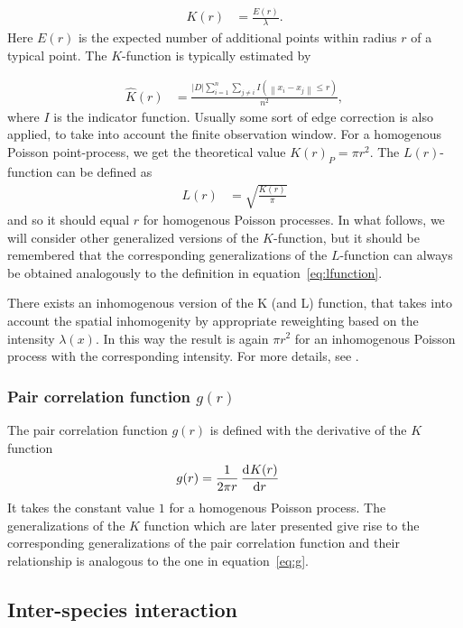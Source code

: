 \documentclass[12pt,a4paper,oneside,article]{memoir}
\begin{document}
\begin{align}
	K(r)&=\frac{E(r)}{\lambda}.
	\label{eq:K}
\end{align}
Here $E(r)$ is the expected number of additional points within radius $r$ 
of a typical point. The $K$-function is typically estimated by

\begin{align}
	\hat{K}(r)&=\frac{\left|D\right|\sum_{i=1}^n\sum_{j\neq i}I\left(\left\| x_i-x_j\right\|\leq r\right)}{n^2},
	\label{eq:Kest}
\end{align} 
where $I$ is the indicator function. Usually some sort of edge correction is also applied, to take into
account the finite observation window. For a homogenous Poisson point-process, we get
the theoretical value $K(r)_{P}=\pi r^2$.
The $L(r)$-function can be defined as
\begin{align}
	L(r)&=\sqrt{\frac{K(r)}{\pi}}
	\label{eq:lfunction}
\end{align}
and so it should equal $r$ for homogenous Poisson processes. In what follows, we will
consider other generalized versions of the $K$-function, but it should be remembered
that the corresponding generalizations of the $L$-function can always be obtained
analogously to the definition in equation~\eqref{eq:lfunction}.

There exists an inhomogenous version of the K (and L) function, that takes into account
the spatial inhomogenity by appropriate reweighting based on the intensity $\lambda(x)$. In this way the result is
again $\pi r^2$ for an inhomogenous Poisson process with the corresponding intensity. For more details,
see \cite{inhomogenousK}.

\subsubsection{Pair correlation function $g(r)$}

The pair correlation function $g(r)$ is defined with the derivative of the $K$ function
\begin{align}
	g(r)&=\frac{1}{2\pi r}\dod{K(r)}{r}
	\label{eq:g}
\end{align}
It takes the constant value $1$ for a homogenous Poisson process. The
generalizations of the $K$ function which are later presented give rise
to the corresponding generalizations of the pair correlation function and
their relationship is analogous to the one in equation~\eqref{eq:g}.


\subsection{Inter-species interaction}
\end{document}
